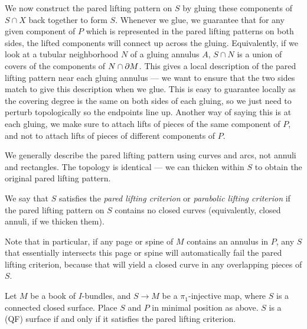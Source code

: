 We now construct the pared lifting pattern on $S$ by gluing these components of
$S \cap X$ back together to form $S$. Whenever we glue, we guarantee that for
any given component of $P$ which is represented in the pared lifting patterns
on both sides, the lifted components will connect up across the gluing.
Equivalently, if we look at a tubular neighborhood $N$ of a gluing annulus $A$,
$S \cap N$ is a union of covers of the components of $N \cap \partial M$. This gives
a local description of the pared lifting pattern near each gluing annulus ---
we want to ensure that the two sides match to give this description when we
glue.  This is easy to guarantee locally as the covering degree is the same on
both sides of each gluing, so we just need to perturb topologically so the
endpoints line up.  Another way of saying this is at each gluing, we make sure
to attach lifts of pieces of the same component of $P$, and not to attach lifts
of pieces of different components of $P$.

We generally describe the pared lifting pattern using curves and arcs, not
annuli and rectangles. The topology is identical --- we can thicken within $S$
to obtain the original pared lifting pattern.

\begin{defn}

We say that $S$ satisfies the \emph{pared lifting criterion} or \emph{parabolic
lifting criterion} if the pared lifting pattern on $S$ contains no closed
curves (equivalently, closed annuli, if we thicken them).

\end{defn}

Note that in particular, if any page or spine of $M$ contains an annulus in
$P$, any $S$ that essentially intersects this page or spine will automatically
fail the pared lifting criterion, because that will yield a closed curve in any
overlapping pieces of $S$.

\begin{theorem}\label{T:lift}

Let $M$ be a book of $I$-bundles, and $S \to M$ be a $\pi_1$-injective map,
where $S$ is a connected closed surface.  Place $S$ and $P$ in minimal position
as above.  $S$ is a (QF) surface if and only if it satisfies the pared lifting
criterion.

\end{theorem}


